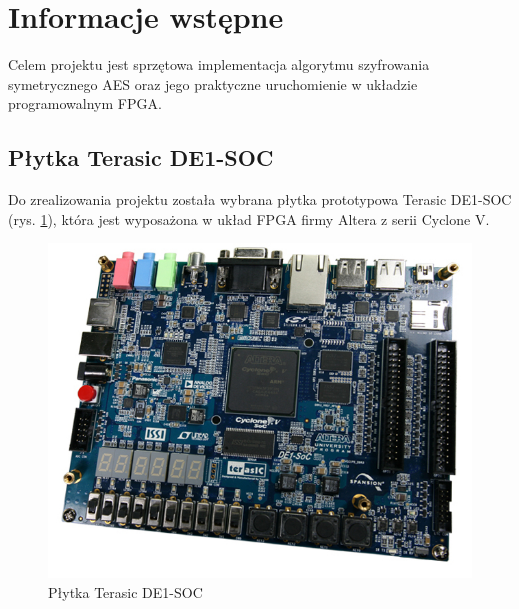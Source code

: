 \section{Informacje wstępne}
\label{sec:infornacje-wstepne}

Celem projektu jest sprzętowa implementacja algorytmu szyfrowania symetrycznego AES oraz jego praktyczne uruchomienie w układzie programowalnym FPGA.

\subsection{Płytka Terasic DE1-SOC}
Do zrealizowania projektu została wybrana płytka prototypowa Terasic DE1-SOC (rys. \ref{fig:fpga-board}), która jest wyposażona w układ FPGA firmy Altera z serii Cyclone V.

\begin{figure}[!h]
\centering
\includegraphics[width=\textwidth]{pictures/fpga-board.jpg}
\caption{Płytka Terasic DE1-SOC}
\label{fig:fpga-board}
\end{figure}


